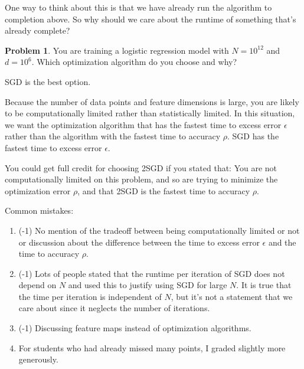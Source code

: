 \documentclass[10pt]{exam}
\theoremstyle{definition}
\newtheorem{problem}{Problem}
\begin{document}
\begin{solution}
\begin{enumerate}
            One way to think about this is that we have already run the algorithm to completion above.
            So why should we care about the runtime of something that's already complete?
    \end{enumerate}
\end{solution}

\newpage
\begin{problem}
You are training a logistic regression model with $N=10^{12}$ and $d=10^6$.
Which optimization algorithm do you choose and why?
\end{problem}
\begin{solution}
    SGD is the best option.

    Because the number of data points and feature dimensions is large,
    you are likely to be computationally limited rather than statistically limited.
    In this situation, we want the optimization algorithm that has the fastest time to excess error $\epsilon$ rather than the algorithm with the fastest time to accuracy $\rho$.
    SGD has the fastest time to excess error $\epsilon$.

    You could get full credit for choosing 2SGD if you stated that:
    You are not computationally limited on this problem,
    and so are trying to minimize the optimization error $\rho$,
    and that 2SGD is the fastest time to accuracy $\rho$.

    Common mistakes:
    \begin{enumerate}
        \item (-1) No mention of the tradeoff between being computationally limited or not or discussion about the difference between the time to excess error $\epsilon$ and the time to accuracy $\rho$.
        \item (-1) Lots of people stated that the runtime per iteration of SGD does not depend on $N$ and used this to justify using SGD for large $N$.
            It is true that the time per iteration is independent of $N$, but it's not a statement that we care about since it neglects the number of iterations.
        \item (-1) Discussing feature maps instead of optimization algorithms.

        \item For students who had already missed many points, I graded slightly more generously.
    \end{enumerate}
\end{solution}
\end{document}
